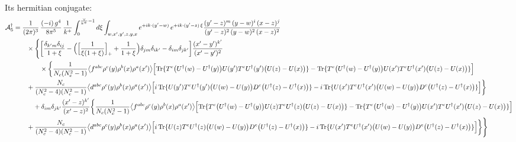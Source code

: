 \documentclass[10pt]{article}
\begin{document}
\noindent Its hermitian conjugate:
\begin{align}
\mathcal{A}_{5}^{\dagger}&=\frac{1}{(2\pi)^{3}}\,\frac{(-i)\,g^{4}}{8\pi^{5}}\,\frac{1}{k^{+}}\int_{0}^{\frac{\vee}{k^{+}}-1}d\xi\int_{w,x',y',z,y,x}e^{+ik\cdot(y'-w)}\,e^{+ik\cdot(y'-z)\,\xi}\frac{(y'-z)^{m}\,(y-w)^{i}\,(x-z)^{j}}{(y'-z)^{2}\,(y-w)^{2}\,(x-z)^{2}}\notag\\
&\qquad\times\Bigg\{\bigg[\frac{\delta_{k'm}\delta_{ij}}{1+\xi}-\Big(\Big[\frac{1}{\xi(1+\xi)}\Big]_{+}+\frac{1}{1+\xi}\Big)\delta_{jm}\delta_{ik'}-\delta_{im}\delta_{jk'}\bigg]\frac{(x'-y')^{k'}}{(x'-y')^{2}}\notag\\
&\qquad\qquad\times\bigg\{\frac{1}{N_{c}(N_{c}^{2}-1)}\big\langle f^{abc}\rho^{c}(y)\rho^{b}(x)\rho^{a}(x')\big\rangle\Big[{\rm Tr}\{T^{e}\big(U^{\dagger}(w)-U^{\dagger}(y)\big)U(y')T^{e}U^{\dagger}(y')\big(U(z)-U(x)\big)\}-{\rm Tr}\{T^{e}\big(U^{\dagger}(w)-U^{\dagger}(y)\big)U(x')T^{e}U^{\dagger}(x')\big(U(z)-U(x)\big)\}\Big]\notag\\&\qquad+\frac{N_{c}}{(N_{c}^{2}-4)(N_{c}^{2}-1)}\big\langle d^{abc}\rho^{c}(y)\rho^{b}(x)\rho^{a}(x')\big\rangle\Big[i\,{\rm Tr}\{U(y')T^{e}U^{\dagger}(y')\big(U(w)-U(y)\big)D^{e}\big(U^{\dagger}(z)-U^{\dagger}(x)\big)\}-i\,{\rm Tr}\{U(x')T^{e}U^{\dagger}(x')\big(U(w)-U(y)\big)D^{e}\big(U^{\dagger}(z)-U^{\dagger}(x)\big)\}\Big]\bigg\}\notag\\
&\qquad\quad+\delta_{im}\delta_{jk'}\frac{(x'-z)^{k'}}{(x'-z)^{2}}\bigg\{\frac{1}{N_{c}(N_{c}^{2}-1)}\big\langle f^{abc}\rho^{c}(y)\rho^{b}(x)\rho^{a}(x')\big\rangle\Big[{\rm Tr}\{T^{e}\big(U^{\dagger}(w)-U^{\dagger}(y)\big)U(z)T^{e}U^{\dagger}(z)\big(U(z)-U(x)\big)\}-{\rm Tr}\{T^{e}\big(U^{\dagger}(w)-U^{\dagger}(y)\big)U(x')T^{e}U^{\dagger}(x')\big(U(z)-U(x)\big)\}\Big]\notag\\&\qquad+\frac{N_{c}}{(N_{c}^{2}-4)(N_{c}^{2}-1)}\big\langle d^{abc}\rho^{c}(y)\rho^{b}(x)\rho^{a}(x')\big\rangle\Big[i\,{\rm Tr}\{U(z)T^{e}U^{\dagger}(z)\big(U(w)-U(y)\big)D^{e}\big(U^{\dagger}(z)-U^{\dagger}(x)\big)\}-i\,{\rm Tr}\{U(x')T^{e}U^{\dagger}(x')\big(U(w)-U(y)\big)D^{e}\big(U^{\dagger}(z)-U^{\dagger}(x)\big)\}\Big]\bigg\}\Bigg\}
\end{align}
\end{document}
